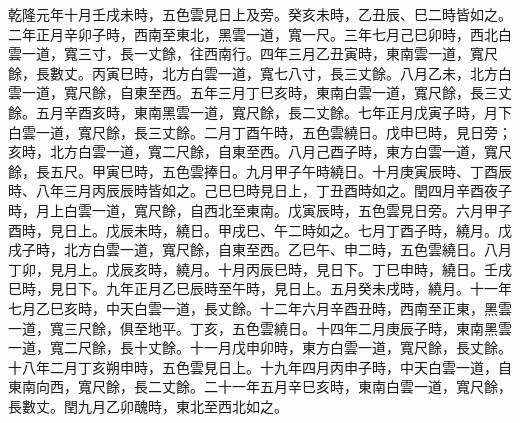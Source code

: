 \begin{pinyinscope}
乾隆元年十月壬戌未時，五色雲見日上及旁。癸亥未時，乙丑辰、巳二時皆如之。二年正月辛卯子時，西南至東北，黑雲一道，寬一尺。三年七月己巳卯時，西北白雲一道，寬三寸，長一丈餘，往西南行。四年三月乙丑寅時，東南雲一道，寬尺餘，長數丈。丙寅巳時，北方白雲一道，寬七八寸，長三丈餘。八月乙未，北方白雲一道，寬尺餘，自東至西。五年三月丁巳亥時，東南白雲一道，寬尺餘，長三丈餘。五月辛酉亥時，東南黑雲一道，寬尺餘，長二丈餘。七年正月戊寅子時，月下白雲一道，寬尺餘，長三丈餘。二月丁酉午時，五色雲繞日。戊申巳時，見日旁；亥時，北方白雲一道，寬二尺餘，自東至西。八月己酉子時，東方白雲一道，寬尺餘，長五尺。甲寅巳時，五色雲捧日。九月甲子午時繞日。十月庚寅辰時、丁酉辰時、八年三月丙辰辰時皆如之。己巳巳時見日上，丁丑酉時如之。閏四月辛酉夜子時，月上白雲一道，寬尺餘，自西北至東南。戊寅辰時，五色雲見日旁。六月甲子酉時，見日上。戊辰未時，繞日。甲戌巳、午二時如之。七月丁酉子時，繞月。戊戌子時，北方白雲一道，寬尺餘，自東至西。乙巳午、申二時，五色雲繞日。八月丁卯，見月上。戊辰亥時，繞月。十月丙辰巳時，見日下。丁巳申時，繞日。壬戌巳時，見日下。九年正月乙巳辰時至午時，見日上。五月癸未戌時，繞月。十一年七月乙巳亥時，中天白雲一道，長丈餘。十二年六月辛酉丑時，西南至正東，黑雲一道，寬三尺餘，俱至地平。丁亥，五色雲繞日。十四年二月庚辰子時，東南黑雲一道，寬二尺餘，長十丈餘。十一月戊申卯時，東方白雲一道，寬尺餘，長丈餘。十八年二月丁亥朔申時，五色雲見日上。十九年四月丙申子時，中天白雲一道，自東南向西，寬尺餘，長二丈餘。二十一年五月辛巳亥時，東南白雲一道，寬尺餘，長數丈。閏九月乙卯醜時，東北至西北如之。


\end{pinyinscope}